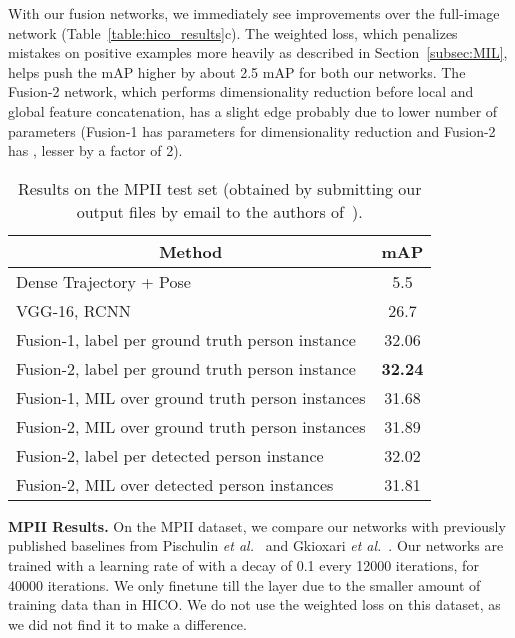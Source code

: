 \documentclass[runningheads]{llncs}
\begin{document}
With our fusion networks, we immediately see improvements over the full-image network (Table~\ref{table:hico_results}c). The weighted loss, which penalizes mistakes on positive examples more heavily as described in Section~\ref{subsec:MIL}, helps push the mAP higher by about 2.5 mAP for both our networks. The Fusion-2 network, which performs dimensionality reduction before local and global feature concatenation, has a slight edge probably due to lower number of parameters (Fusion-1 has  parameters for dimensionality reduction and Fusion-2 has , lesser by a factor of 2).




\begin{table}[h!]
	\begin{center}
		\begin{tabular}{l|c}
			\hline
			\multicolumn{1}{c|}{\bf Method} 			& {\bf mAP }	\\ \hline
			Dense Trajectory + Pose~\cite{pishchulin2014fine}					& 5.5		\\ 
			VGG-16, RCNN~\cite{gkioxari2015rstarcnn}						& 26.7		\\ \hline
            Fusion-1, label per ground truth person instance				& 32.06		\\ 
			Fusion-2, label per ground truth person instance				& {\bf 32.24} \\
			Fusion-1, MIL over ground truth person instances				& 31.68		\\ 
			Fusion-2, MIL over ground truth person instances				& 31.89		  \\ 
 \hline
			Fusion-2, label per detected person instance				& 32.02		  \\
            Fusion-2, MIL over detected person instances				& 31.81		  \\

		\end{tabular}
	\end{center}
	\caption{Results on the MPII test set (obtained by submitting our output files by email to the authors of~\cite{pishchulin2014fine}).}
\label{table:mpii_results}
\end{table}

{\bf MPII Results.} 
On the MPII dataset, we compare our networks with previously published baselines from Pischulin \emph{et al.}~\cite{pishchulin2014fine} and Gkioxari \emph{et al.}~\cite{gkioxari2015rstarcnn}. Our networks are trained with a learning rate of  with a decay of 0.1 every 12000 iterations, for 40000 iterations. We only finetune till the  layer due to the smaller amount of training data than in HICO. We do not use the weighted loss on this dataset, as we did not find it to make a difference.
\end{document}
